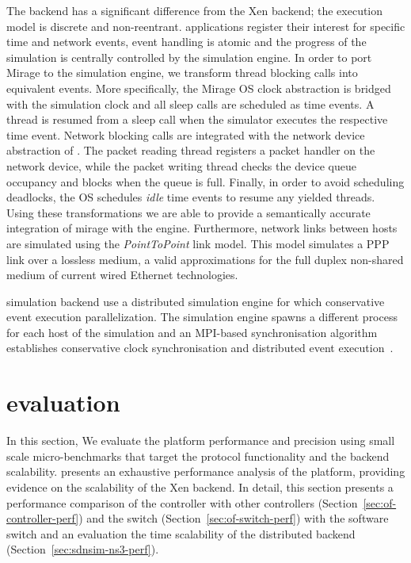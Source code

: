 The  backend has a significant difference from the Xen backend; the
execution model is discrete and non-reentrant.  applications register
their interest for specific time and network events, event handling is atomic
and the progress of the simulation is centrally controlled by the simulation
engine. In order to port Mirage to the  simulation engine, we transform
thread blocking calls into equivalent  events.  More specifically, the
Mirage OS clock abstraction is bridged with the  simulation clock and all
sleep calls are scheduled as  time events.  A thread is resumed from a
sleep call when the simulator executes the respective time event.  Network
blocking calls are integrated with the network device abstraction of .
The packet reading thread registers a packet handler on the network device,
while the packet writing thread checks the device queue occupancy and blocks
when the queue is full. Finally, in order to avoid scheduling deadlocks, the OS
schedules {\it idle} \/time events to resume any yielded threads. Using these
transformations we are able to provide a semantically accurate integration of
mirage with the  engine.  Furthermore, network links between hosts are
simulated using the {\it PointToPoint} \/link model. This model simulates a PPP
link over a lossless medium, a valid approximations for the full duplex
non-shared medium of current wired Ethernet technologies.

\sdnsim simulation backend use a distributed simulation engine for  which
conservative event execution parallelization. The simulation engine spawns a
different process for each host of the simulation and an MPI-based
synchronisation algorithm establishes conservative clock synchronisation and
distributed event execution~. 


\section{\sdnsim evaluation} \label{sec:sdnsim-precision}

In this section, We evaluate the \sdnsim platform performance and precision
using small scale micro-benchmarks that target the \of protocol functionality
and the  backend scalability.   presents an
exhaustive performance analysis of the \mirage platform, providing evidence on
the scalability of the Xen backend. In detail, this section presents a
performance comparison of the \mirage \of controller with other controllers
(Section~\ref{sec:of-controller-perf}) and the \mirage \of switch
(Section~\ref{sec:of-switch-perf}) with the \ovs software switch
and an evaluation the time scalability of the distributed  backend
(Section~\ref{sec:sdnsim-ns3-perf}).

